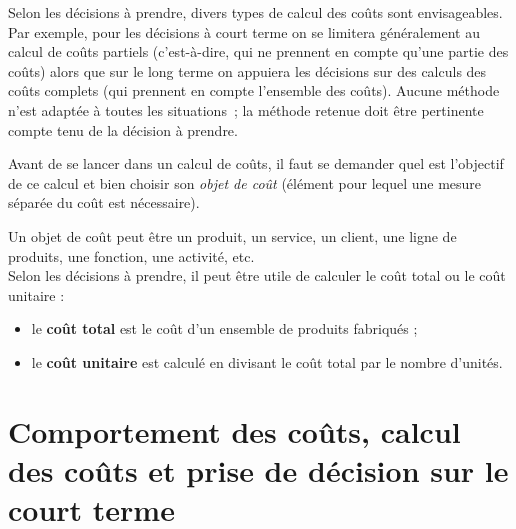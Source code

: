 \documentclass{kaobook}
\begin{document}
Selon les décisions à prendre, divers types de calcul des coûts sont envisageables. Par exemple, pour les décisions à court terme on se limitera généralement au calcul de coûts partiels (c'est-à-dire, qui ne prennent en compte qu'une partie des coûts) alors que sur le long terme on appuiera les décisions sur des calculs des coûts complets (qui prennent en compte l'ensemble des coûts). Aucune méthode n'est adaptée à toutes les situations ; la méthode retenue doit être pertinente compte tenu de la décision à prendre.\\
\begin{warning}
Avant de se lancer dans un calcul de coûts, il faut se demander quel est l'objectif de ce calcul et bien choisir son \emph{objet de coût} (élément pour lequel une mesure séparée du coût est nécessaire).\\
\end{warning}
Un objet de coût peut être un produit, un service, un client, une ligne de produits, une fonction, une activité, etc.\\

Selon les décisions à prendre, il peut être utile de calculer le coût total ou le coût unitaire :\\
\begin{itemize}
\item le \textbf{coût total} est le coût d'un ensemble de produits fabriqués ;\\
\item le \textbf{coût unitaire} est calculé en divisant le coût total par le nombre d'unités.\\
\end{itemize}

\section{Comportement des coûts, calcul des coûts et prise de décision sur le court terme}
\label{sec:org1e105ce}
\end{document}

